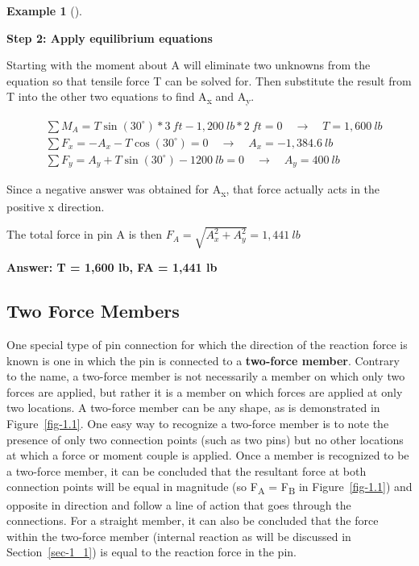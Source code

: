 \documentclass[
  letterpaper,
  DIV=11,
  numbers=noendperiod]{scrreprt}
\theoremstyle{definition}
\newtheorem{example}{Example}[chapter]
\theoremstyle{remark}
\begin{document}
\begin{tcolorbox}
\begin{example}[]
\begin{tcolorbox}
\textbf{Step 2: Apply equilibrium equations}

Starting with the moment about A will eliminate two unknowns from the
equation so that tensile force T can be solved for. Then substitute the
result from T into the other two equations to find A\textsubscript{x}
and A\textsubscript{y}.

\[
\begin{aligned}
& \sum M_A=T \sin (30^{\circ}) * 3{~ft}-1,200{~lb }*2{~ft}=0 \quad\rightarrow\quad T=1,600 {~lb} \\
& \sum F_x=-A_x-T \cos (30^{\circ})=0 \quad\rightarrow\quad A_x=-1,384.6{~lb} \\
& \sum F_y=A_y+T \sin (30^{\circ})-1200{~lb}=0 \quad\rightarrow\quad A_y= 400{~lb}
\end{aligned}
\]

Since a negative answer was obtained for A\textsubscript{x}, that force
actually acts in the positive x direction.

The total force in pin A is then \(F_A=\sqrt{A_x^2+A_y^2}=1,441{~lb}\)

\textbf{Answer: T = 1,600 lb, FA = 1,441 lb}

\end{tcolorbox}

\end{example}

\end{tcolorbox}

\subsection{Two Force Members}\label{two-force-members}

One special type of pin connection for which the direction of the
reaction force is known is one in which the pin is connected to a
\textbf{two-force member}. Contrary to the name, a two-force member is
not necessarily a member on which only two forces are applied, but
rather it is a member on which forces are applied at only two locations.
A two-force member can be any shape, as is demonstrated in
Figure~\ref{fig-1.1}. One easy way to recognize a two-force member is to
note the presence of only two connection points (such as two pins) but
no other locations at which a force or moment couple is applied. Once a
member is recognized to be a two-force member, it can be concluded that
the resultant force at both connection points will be equal in magnitude
(so F\textsubscript{A} = F\textsubscript{B} in Figure~\ref{fig-1.1}) and
opposite in direction and follow a line of action that goes through the
connections. For a straight member, it can also be concluded that the
force within the two-force member (internal reaction as will be
discussed in Section~\ref{sec-1_1}) is equal to the reaction force in
the pin.
\end{document}
